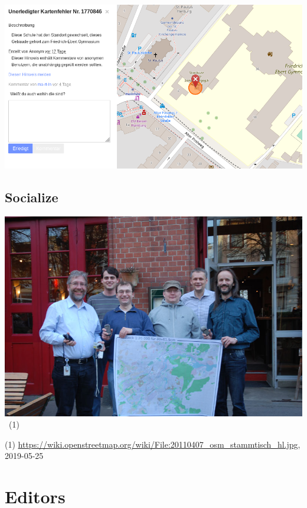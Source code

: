 \documentclass{beamer}
\begin{document}
	\begin{frame}
		\begin{center}
			\includegraphics[width=\linewidth,height=\textheight,keepaspectratio]{images/report-error-2}
		\end{center}
	\end{frame}
	
	\subsection{Socialize}
	
	\begin{frame}
		\begin{center}
			\includegraphics[width=0.8\linewidth,height=0.8\textheight,keepaspectratio]{images/socializing}~\tiny{(1)}
		\end{center}
		{\tiny (1) \url{https://wiki.openstreetmap.org/wiki/File:20110407_osm_stammtisch_hl.jpg}, 2019-05-25}
	\end{frame}
	
	\section{Editors}
	
\end{document}
